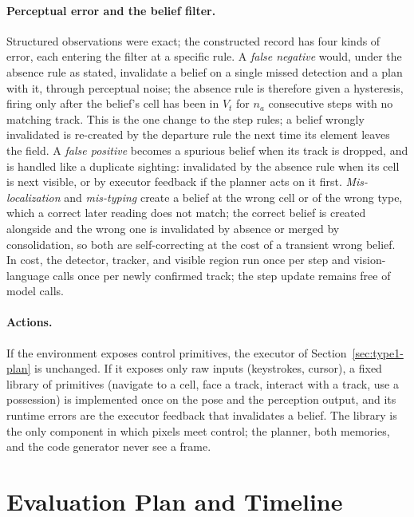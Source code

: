 \documentclass[10pt]{article}
\newcommand{\Vis}{V}
\begin{document}
\paragraph{Perceptual error and the belief filter.}\label{sec:pixels-error}
Structured observations were exact; the constructed record has four kinds of error, each entering the filter at a specific rule. A \emph{false negative} would, under the absence rule as stated, invalidate a belief on a single missed detection and a plan with it, through perceptual noise; the absence rule is therefore given a hysteresis, firing only after the belief's cell has been in $\Vis_t$ for $n_a$ consecutive steps with no matching track. This is the one change to the step rules; a belief wrongly invalidated is re-created by the departure rule the next time its element leaves the field. A \emph{false positive} becomes a spurious belief when its track is dropped, and is handled like a duplicate sighting: invalidated by the absence rule when its cell is next visible, or by executor feedback if the planner acts on it first. \emph{Mis-localization} and \emph{mis-typing} create a belief at the wrong cell or of the wrong type, which a correct later reading does not match; the correct belief is created alongside and the wrong one is invalidated by absence or merged by consolidation, so both are self-correcting at the cost of a transient wrong belief. In cost, the detector, tracker, and visible region run once per step and vision-language calls once per newly confirmed track; the step update remains free of model calls.

\paragraph{Actions.}
If the environment exposes control primitives, the executor of Section~\ref{sec:type1-plan} is unchanged. If it exposes only raw inputs (keystrokes, cursor), a fixed library of primitives (navigate to a cell, face a track, interact with a track, use a possession) is implemented once on the pose and the perception output, and its runtime errors are the executor feedback that invalidates a belief. The library is the only component in which pixels meet control; the planner, both memories, and the code generator never see a frame.

\section{Evaluation Plan and Timeline}
\label{sec:eval}
\end{document}
